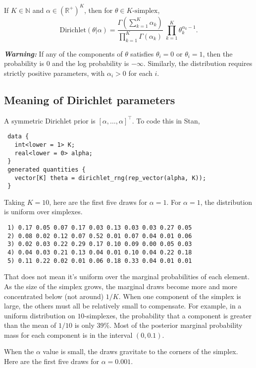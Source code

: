 \documentclass[
  10pt,
]{book}
\begin{document}
If \(K \in \mathbb{N}\) and \(\alpha \in (\mathbb{R}^+)^{K}\), then for
\(\theta \in \text{$K$-simplex}\), \[ \text{Dirichlet}(\theta|\alpha) =
\frac{\Gamma \! \left( \sum_{k=1}^K \alpha_k \right)}
{\prod_{k=1}^K \Gamma(\alpha_k)} \ \prod_{k=1}^K \theta_k^{\alpha_k -
1} . \]

\emph{\textbf{Warning:}} If any of the components of \(\theta\) satisfies
\(\theta_i = 0\) or \(\theta_i = 1\), then the probability is 0 and the
log probability is \(-\infty\). Similarly, the distribution requires
strictly positive parameters, with \(\alpha_i > 0\) for each \(i\).

\hypertarget{meaning-of-dirichlet-parameters}{%
\subsection{Meaning of Dirichlet parameters}\label{meaning-of-dirichlet-parameters}}

A symmetric Dirichlet prior is \([\alpha, \ldots, \alpha]^{\top}\). To
code this in Stan,

\begin{verbatim}
 data {
   int<lower = 1> K;
   real<lower = 0> alpha;
 }
 generated quantities {
   vector[K] theta = dirichlet_rng(rep_vector(alpha, K));
 }
\end{verbatim}

Taking \(K = 10\), here are the first five draws for \(\alpha = 1\).
For \(\alpha = 1\), the distribution is uniform over simplexes.

\begin{verbatim}
 1) 0.17 0.05 0.07 0.17 0.03 0.13 0.03 0.03 0.27 0.05
 2) 0.08 0.02 0.12 0.07 0.52 0.01 0.07 0.04 0.01 0.06
 3) 0.02 0.03 0.22 0.29 0.17 0.10 0.09 0.00 0.05 0.03
 4) 0.04 0.03 0.21 0.13 0.04 0.01 0.10 0.04 0.22 0.18
 5) 0.11 0.22 0.02 0.01 0.06 0.18 0.33 0.04 0.01 0.01
\end{verbatim}

That does not mean it's uniform over the marginal probabilities of
each element. As the size of the simplex grows, the marginal draws
become more and more concentrated below (not around) \(1/K\). When one
component of the simplex is large, the others must all be relatively
small to compensate. For example, in a uniform distribution on
\(10\)-simplexes, the probability that a component is greater than the
mean of \(1/10\) is only 39\%. Most of the posterior marginal
probability mass for each component is in the interval \((0, 0.1)\).

When the \(\alpha\) value is small, the draws gravitate to the corners
of the simplex. Here are the first five draws for \(\alpha = 0.001\).
\end{document}
